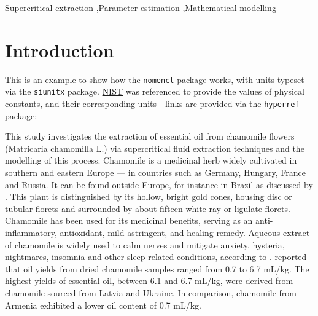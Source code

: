 \documentclass[a4paper,fleqn]{cas-dc}
\begin{document}
\begin{keywords}
Supercritical extraction \sep Parameter estimation \sep Mathematical modelling
\end{keywords}

\maketitle


\section{Introduction}

\noindent This is an example to show how the \texttt{nomencl} package works, with units typeset via the \texttt{siunitx} package. \href{https://www.nist.gov/pml/fundamental-physical-constants}{NIST} was referenced to provide the values of physical constants, and their corresponding units---links are provided via the \texttt{hyperref} package:


\printnomenclature

This study investigates the extraction of essential oil from chamomile flowers (Matricaria chamomilla L.) via supercritical fluid extraction techniques and the modelling of this process. Chamomile is a medicinal herb widely cultivated in southern and eastern Europe — in countries such as Germany, Hungary, France and Russia. It can be found outside Europe, for instance in Brazil as discussed by \citet{Singh2011}. This plant is distinguished by its hollow, bright gold cones, housing disc or tubular florets and surrounded by about fifteen white ray or ligulate florets. Chamomile has been used for its medicinal benefits, serving as an anti-inflammatory, antioxidant, mild astringent, and healing remedy. Aqueous extract of chamomile is widely used to calm nerves and mitigate anxiety, hysteria, nightmares, insomnia and other sleep-related conditions, according to \citet{Srivastava2009}. \citet{Orav2010} reported that oil yields from dried chamomile samples ranged from 0.7 to 6.7 mL/kg. The highest yields of essential oil, between 6.1 and 6.7 mL/kg, were derived from chamomile sourced from Latvia and Ukraine. In comparison, chamomile from Armenia exhibited a lower oil content of 0.7 mL/kg.
\end{document}
